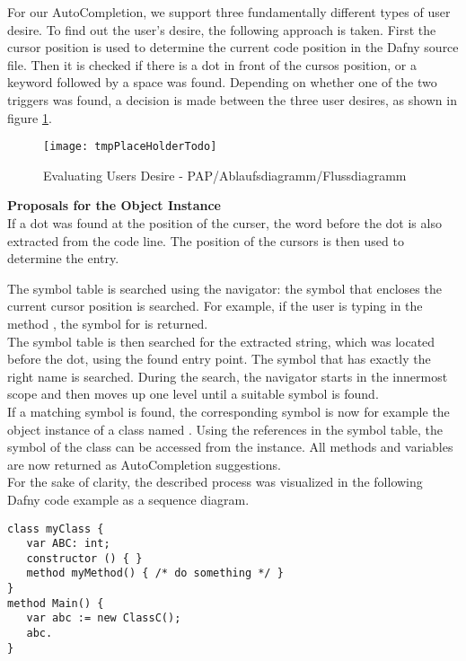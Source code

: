 For our AutoCompletion, we support three fundamentally different types of user desire.
To find out the user's desire, the following approach is taken.
First the cursor position is used to determine the current code position in the Dafny source file.
Then it is checked if there is a dot in front of the cursos position,
or a  keyword followed by a space was found.
Depending on whether one of the two triggers was found,
a decision is made between the three user desires, as shown in figure \ref{fig:get_users_desire}.

\begin{figure}[H]
    \centering
    \texttt{[image: tmpPlaceHolderTodo]}
    \caption{Evaluating Users Desire - PAP/Ablaufsdiagramm/Flussdiagramm}
    \label{fig:get_users_desire}
\end{figure}

\textbf{Proposals for the Object Instance}\\
If a dot was found at the position of the curser, the word before the dot is also extracted from the code line.
The position of the cursors is then used to determine the entry.

The symbol table is searched using the navigator:
the symbol that encloses the current cursor position is searched.
For example, if the user is typing in the method , the symbol for  is returned. \\

The symbol table is then searched for the extracted string,
which was located before the dot, using the found entry point.
The symbol that has exactly the right name is searched.
During the search, the navigator starts in the innermost scope and then moves up one level until a suitable symbol is found. \\

If a matching symbol is found, the corresponding symbol is now
for example the object instance of a class named .
Using the references in the symbol table, the symbol of the class can be accessed from the instance.
All methods and variables are now returned as AutoCompletion suggestions. \\

For the sake of clarity, the described process was visualized in the following
Dafny code example  as a sequence diagram.

\begin{lstlisting}[language=dafny, caption={tmptodo.dfy}, captionpos=b, label={lst:tmptodo}]
class myClass {
   var ABC: int;
   constructor () { }
   method myMethod() { /* do something */ }
}
method Main() {
   var abc := new ClassC();
   abc.
}
\end{lstlisting}

